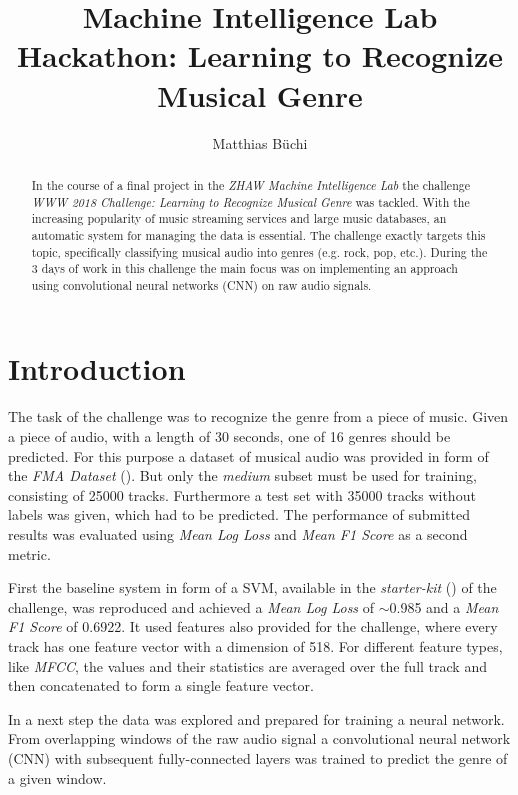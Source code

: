 \documentclass[11pt, twocolumn]{article}
\title{Machine Intelligence Lab Hackathon: Learning to Recognize Musical Genre}
\author{Matthias Büchi}
\begin{document}
\maketitle

\begin{abstract}
In the course of a final project in the \textit{ZHAW Machine Intelligence Lab} the challenge \textit{WWW 2018 Challenge: Learning to Recognize Musical Genre} was tackled. With the increasing popularity of music streaming services and large music databases, an automatic system for managing the data is essential. The challenge exactly targets this topic, specifically classifying musical audio into genres (e.g. rock, pop, etc.). During the 3 days of work in this challenge the main focus was on implementing an approach using convolutional neural networks (CNN) on raw audio signals.
\end{abstract}

\section{Introduction}

The task of the challenge was to recognize the genre from a piece of music. Given a piece of audio, with a length of 30 seconds, one of 16 genres should be predicted. For this purpose a dataset of musical audio was provided in form of the \textit{FMA Dataset} (\cite{fma}). But only the \textit{medium} subset must be used for training, consisting of 25000 tracks. Furthermore a test set with 35000 tracks without labels was given, which had to be predicted. The performance of submitted results was evaluated using \textit{Mean Log Loss} and \textit{Mean F1 Score} as a second metric. 

First the baseline system in form of a SVM, available in the \textit{starter-kit} (\cite{starterkit}) of the challenge, was reproduced and achieved a \textit{Mean Log Loss} of $\sim$0.985 and a \textit{Mean F1 Score} of 0.6922. It used features also provided for the challenge, where every track has one feature vector with a dimension of 518. For different feature types, like \textit{MFCC}, the values and their statistics are averaged over the full track and then concatenated to form a single feature vector.

In a next step the data was explored and prepared for training a neural network. From overlapping windows of the raw audio signal a convolutional neural network (CNN) with subsequent fully-connected layers was trained to predict the genre of a given window.
\end{document}
